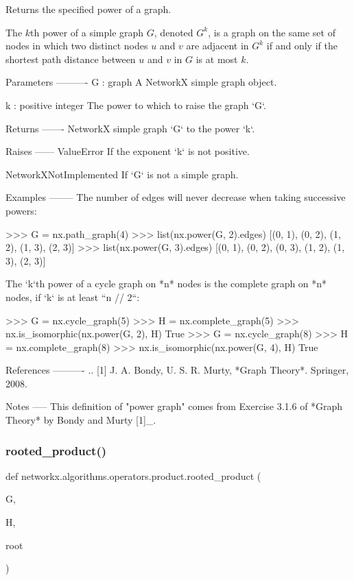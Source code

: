 \begin{DoxyVerb}Returns the specified power of a graph.

The $k$th power of a simple graph $G$, denoted $G^k$, is a
graph on the same set of nodes in which two distinct nodes $u$ and
$v$ are adjacent in $G^k$ if and only if the shortest path
distance between $u$ and $v$ in $G$ is at most $k$.

Parameters
----------
G : graph
    A NetworkX simple graph object.

k : positive integer
    The power to which to raise the graph `G`.

Returns
-------
NetworkX simple graph
    `G` to the power `k`.

Raises
------
ValueError
    If the exponent `k` is not positive.

NetworkXNotImplemented
    If `G` is not a simple graph.

Examples
--------
The number of edges will never decrease when taking successive
powers:

>>> G = nx.path_graph(4)
>>> list(nx.power(G, 2).edges)
[(0, 1), (0, 2), (1, 2), (1, 3), (2, 3)]
>>> list(nx.power(G, 3).edges)
[(0, 1), (0, 2), (0, 3), (1, 2), (1, 3), (2, 3)]

The `k`th power of a cycle graph on *n* nodes is the complete graph
on *n* nodes, if `k` is at least ``n // 2``:

>>> G = nx.cycle_graph(5)
>>> H = nx.complete_graph(5)
>>> nx.is_isomorphic(nx.power(G, 2), H)
True
>>> G = nx.cycle_graph(8)
>>> H = nx.complete_graph(8)
>>> nx.is_isomorphic(nx.power(G, 4), H)
True

References
----------
.. [1] J. A. Bondy, U. S. R. Murty, *Graph Theory*. Springer, 2008.

Notes
-----
This definition of "power graph" comes from Exercise 3.1.6 of
*Graph Theory* by Bondy and Murty [1]_.\end{DoxyVerb}
 \mbox{\label{namespacenetworkx_1_1algorithms_1_1operators_1_1product_a737cdf389d0bbf790ef6f4b15e84517e}} 
\subsubsection{\texorpdfstring{rooted\+\_\+product()}{rooted\_product()}}
{\footnotesize\ttfamily def networkx.\+algorithms.\+operators.\+product.\+rooted\+\_\+product (\begin{DoxyParamCaption}\item[{}]{G,  }\item[{}]{H,  }\item[{}]{root }\end{DoxyParamCaption})}

